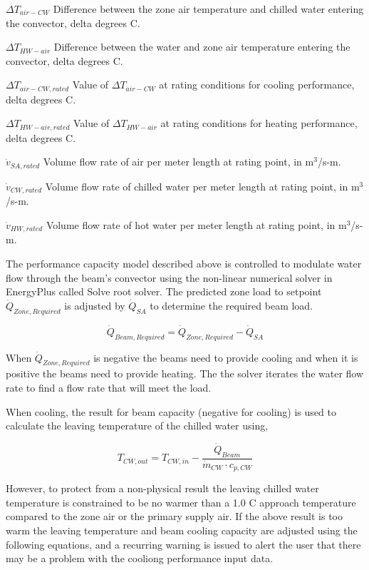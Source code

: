 \({\Delta T_{air-CW}}\) Difference between the zone air temperature and chilled water entering the convector, delta degrees C.

\({\Delta T_{HW-air}}\) Difference between the water and zone air temperature entering the convector, delta degrees C.

\({\Delta T_{air-CW,rated}}\) Value of \({\Delta T_{air-CW}}\) at rating conditions for cooling performance, delta degrees C.

\({\Delta T_{HW-air,rated}}\) Value of \({\Delta T_{HW-air}}\) at rating conditions for heating performance, delta degrees C.

\({\dot v_{SA,rated}}\) Volume flow rate of air per meter length at rating point, in m\(^{3}\)/s-m.

\({\dot v_{CW,rated}}\) Volume flow rate of chilled water per meter length at rating point, in m\(^{3}\)/s-m.

\({\dot v_{HW,rated}}\) Volume flow rate of hot water per meter length at rating point, in m\(^{3}\)/s-m.

The performance capacity model described above is controlled to modulate water flow through the beam's convector using the non-linear numerical solver in EnergyPlus called Solve root solver. The predicted zone load to setpoint \({\dot Q_{Zone, Required}}\) is adjusted by \({\dot Q_{SA}}\) to determine the required beam load.

\begin{equation}
{\dot Q_{Beam, Required}} = {\dot Q_{Zone, Required}} - {\dot Q_{SA}}
\end{equation}

When \({\dot Q_{Zone, Required}}\) is negative the beams need to provide cooling and when it is positive the beams need to provide heating. The the solver iterates the water flow rate to find a flow rate that will meet the load.

When cooling, the result for beam capacity (negative for cooling) is used to calculate the leaving temperature of the chilled water using,

\begin{equation}
{T_{CW,out}} = {T_{CW,in}} - \frac{{\dot Q_{Beam}}}{{\dot m_{CW}} \cdot {c_{p,CW}} }
\end{equation}

However, to protect from a non-physical result the leaving chilled water temperature is constrained to be no warmer than a 1.0 C approach temperature compared to the zone air or the primary supply air. If the above result is too warm the leaving temperature and beam cooling capacity are adjusted using the following equations, and a recurring warning is issued to alert the user that there may be a problem with the cooliong performance input data.

